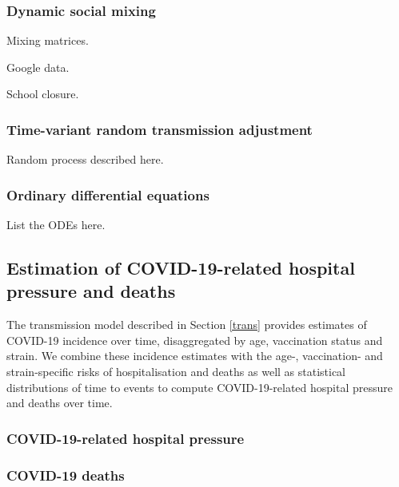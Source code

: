 \subsubsection{Dynamic social mixing}
Mixing matrices.

Google data.

School closure.

\subsubsection{Time-variant random transmission adjustment}
Random process described here.

\subsubsection{Ordinary differential equations}
List the ODEs here.


\subsection{Estimation of COVID-19-related hospital pressure and deaths}
The transmission model described in Section \ref{trans} provides estimates of COVID-19 incidence over time, disaggregated by age, vaccination status and strain. 
We combine these incidence estimates with the age-, vaccination- and strain-specific risks of hospitalisation and deaths as well as 
statistical distributions of time to events to compute COVID-19-related hospital pressure and deaths over time.

\subsubsection{COVID-19-related hospital pressure}
\label{hosp}
 

\subsubsection{COVID-19 deaths}
 

